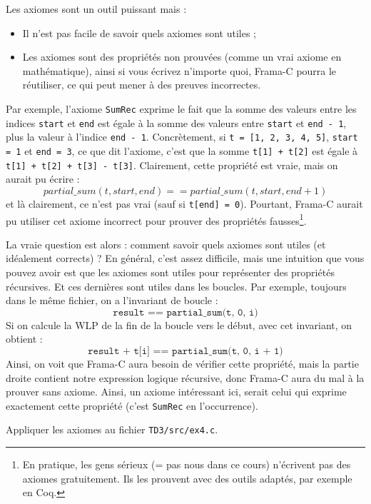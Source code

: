 \documentclass{article}
\begin{document}
\begin{Exercice}{}{}
    Les axiomes sont un outil puissant mais :
    \begin{itemize}[label=$\bullet$]
        \item Il n'est pas facile de savoir quels axiomes sont utiles ;
        \item Les axiomes sont des propriétés non prouvées (comme un vrai
        axiome en mathématique), ainsi si vous écrivez n'importe quoi,
        Frama-C pourra le réutiliser, ce qui peut mener à des preuves
        incorrectes.
    \end{itemize}
    Par exemple, l'axiome \texttt{SumRec} exprime le fait que la somme
    des valeurs entre les indices \texttt{start} et \texttt{end} est égale
    à la somme des valeurs entre \texttt{start} et \texttt{end - 1},
    plus la valeur à l'indice \texttt{end - 1}.
    Concrètement, si \texttt{t = [1, 2, 3, 4, 5]}, \texttt{start = 1} et 
    \texttt{end = 3}, ce que dit l'axiome, c'est que la somme
    \texttt{t[1] + t[2]} est égale à \texttt{t[1] + t[2] + t[3] - t[3]}.
    Clairement, cette propriété est vraie, mais on aurait pu écrire :
    \[
        partial\_sum(t, start, end) ==  partial\_sum(t, start, end + 1)
    \]
    et là clairement, ce n'est pas vrai (sauf si \texttt{t[end] = 0}).
    Pourtant, Frama-C aurait pu utiliser cet axiome incorrect
    pour prouver des propriétés fausses\footnote{En pratique,
    les gens sérieux (= pas nous dans ce cours) n'écrivent pas des axiomes
    gratuitement.
    Ils les prouvent avec des outils adaptés, par exemple en Coq.}.

    \medskip

    La vraie question est alors : comment savoir quels axiomes sont
    utiles (et idéalement corrects) ?
    En général, c'est assez difficile, mais une intuition que vous pouvez 
    avoir est que les axiomes sont utiles pour représenter des propriétés
    récursives.
    Et ces dernières sont utiles dans les boucles.
    Par exemple, toujours dans le même fichier, on a l'invariant de boucle :
    \[
        \texttt{result == partial\_sum(t, 0, i)}
    \]
    Si on calcule la WLP de la fin de la boucle vers le début, avec cet invariant,
    on obtient :
    \[
        \texttt{result + t[i] == partial\_sum(t, 0, i + 1)}
    \]
    Ainsi, on voit que Frama-C aura besoin de vérifier cette propriété,
    mais la partie droite contient notre expression logique récursive,
    donc Frama-C aura du mal à la prouver sans axiome.
    Ainsi, un axiome intéressant ici, serait celui qui exprime exactement
    cette propriété (c'est \texttt{SumRec} en l'occurrence).

    \medskip

    Appliquer les axiomes au fichier \texttt{TD3/src/ex4.c}.
\end{Exercice}
\end{document}
